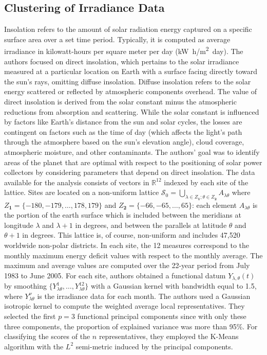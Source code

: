 \subsection{Clustering of Irradiance Data}
\label{subsec:irradiance}
Insolation refers to the amount of solar radiation energy captured on a specific surface area over a set time period. Typically, it is computed as average irradiance in kilowatt-hours per square meter per day (\unit{\kilo\watt.h/\metre^2.day}). The authors focused on direct insolation, which pertains to the solar irradiance measured at a particular location on Earth with a surface facing directly toward the sun's rays, omitting diffuse insolation. Diffuse insolation refers to the solar energy scattered or reflected by atmospheric components overhead. The value of direct insolation is derived from the solar constant minus the atmospheric reductions from absorption and scattering. While the solar constant is influenced by factors like Earth's distance from the sun and solar cycles, the losses are contingent on factors such as the time of day (which affects the light's path through the atmosphere based on the sun's elevation angle), cloud coverage, atmospheric moisture, and other contaminants. The authors' goal was to identify areas of the planet that are optimal with respect to the positioning of solar power collectors by considering parameters that depend on direct insolation. The data available for the analysis consists of vectors in $\mathbb{R}^{12}$ indexed by each site of the lattice. Sites are located on a non-uniform lattice $\mathcal{S}_0=\bigcup_{\lambda \in Z_{\mathbf{1}};\theta \in Z_{\mathbf{2}}}A_{\lambda\theta}$ where $Z_{\mathbf{1}} = \{ -180, -179, \dots, 178, 179\}$ and $Z_{\mathbf{2}} = \{ -66, -65, \dots, 65\}$: each element $A_{\lambda\theta}$ is the portion of the earth surface which is included between the meridians at longitude $\lambda$ and $\lambda + 1$ in degrees, and between the parallels at latitude $\theta$ and $\theta + 1$ in degrees. This lattice is, of course, non-uniform and includes 47,520 worldwide non-polar districts. In each site, the 12 measures correspond to the monthly maximum energy deficit values with respect to the monthly average. The maximum and average values are computed over the 22-year period from July 1983 to June 2005. For each site, authors obtained a functional datum $Y_{\lambda,\theta}(t)$ by smoothing $\{Y_{\lambda\theta}^1, \dots, Y_{\lambda\theta}^12\}$ with a Gaussian kernel with bandwidth equal to 1.5, where $Y_{\lambda\theta}^\nu$ is the irradiance data for each month. The authors used a Gaussian isotropic kernel to compute the weighted average local representatives. They selected the first $p=3$ functional principal components since with only these three components, the proportion of explained variance was more than 95\%. For classifying the scores of the $n$ representatives, they employed the K-Means algorithm with the $L^2$ semi-metric induced by the principal components.
